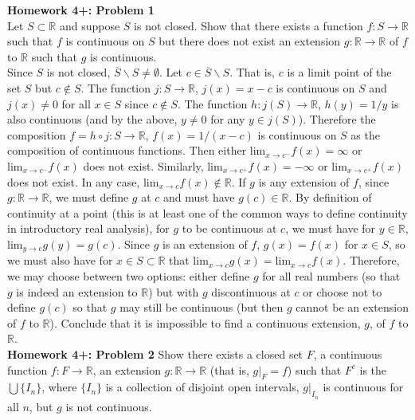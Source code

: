 \documentclass[a4paper]{article}
\begin{document}
{\bf Homework 4+: Problem 1}\\

Let $S\subset \mathbb{R}$ and suppose $S$ is not closed. Show that there exists a function $f:S\rightarrow \mathbb{R}$ such that $f$ is continuous on $S$ but there does not exist an extension $g:\mathbb{R}\rightarrow \mathbb{R}$ of $f$ to $\mathbb{R}$ such that $g$ is continuous.\\

Since $S$ is not closed, $\overline{S}\backslash S \neq \emptyset$. Let $c \in \overline{S} \backslash S$. That is, $c$ is a limit point of the set $S$ but $c \not\in S$. The function $j:S \rightarrow \mathbb{R}$, $j(x) = x-c$ is continuous on $S$ and $j(x) \neq 0$ for all $x \in S$ since $c \not\in S$. The function $h: j(S) \rightarrow \mathbb{R}$, $h(y) = 1/y$ is also continuous (and by the above, $y \neq 0$ for any $y \in j(S)$). Therefore the composition $f = h\circ j : S \rightarrow \mathbb{R}$, $f(x) =1 /(x-c)$ is continuous on $S$ as the composition of continuous functions. Then either $\text{lim}_{x\rightarrow c^-} f(x) = \infty$ or $\text{lim}_{x\rightarrow c^-} f(x)$ does not exist. Similarly, $\text{lim}_{x\rightarrow c^+} f(x) = -\infty$ or $\text{lim}_{x\rightarrow c^+} f(x)$ does not exist. In any case, $\text{lim}_{x\rightarrow c} f(x) \not\in \mathbb{R}$. If $g$ is any extension of $f$, since $g:\mathbb{R}\rightarrow \mathbb{R}$, we must define $g$ at $c$ and must have $g(c) \in \mathbb{R}$. By definition of continuity at a point (this is at least one of the common ways to define continuity in introductory real analysis), for $g$ to be continuous at $c$, we must have for $y \in \mathbb{R}$, $\text{lim}_{y \rightarrow c} g(y) = g(c)$. Since $g$ is an extension of $f$, $g(x) = f(x)$ for $x \in S$, so we must also have for $x \in S\subset \mathbb{R}$ that $\text{lim}_{x \rightarrow c} g(x) = \text{lim}_{x \rightarrow c} f(x)$. Therefore, we may choose between two options: either define $g$ for all real numbers (so that $g$ is indeed an extension to $\mathbb{R}$) but with $g$ discontinuous at $c$ or choose not to define $g(c)$ so that $g$ may still be continuous (but then $g$ cannot be an extension of $f$ to $\mathbb{R}$). Conclude that it is impossible to find a continuous extension, $g$, of $f$ to $\mathbb{R}$. \\

{\bf Homework 4+: Problem 2} Show there exists a closed set $F$, a continuous function $f:F\rightarrow \mathbb{R}$, an extension $g: \mathbb{R}\rightarrow \mathbb{R}$  (that is, $g\rvert_F = f$) such that $F^c$ is the $\bigcup \{I_n\}$, where $\{I_n\}$ is a collection of disjoint open intervals, $g\rvert_{\overline{I_n}}$  is continuous for all $n$, but $g$ is not continuous.\\
\end{document}
